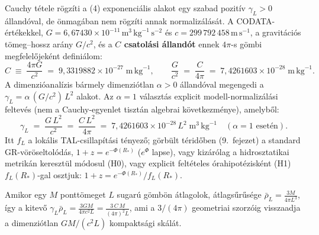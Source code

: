 \documentclass[10pt,a4paper]{article}
\begin{document}
\par
Cauchy t\'etele r\"ogz\'iti a (4) exponenci\'alis alakot egy szabad pozit\'iv $\gamma_L > 0$ \'alland\'oval, de \"onmag\'aban nem r\"ogz\'iti annak normaliz\'al\'as\'at. A CODATA-\'ert\'ekekkel, $G = 6{,}67430\times 10^{-11}\,\text{m}^3\,\text{kg}^{-1}\,\text{s}^{-2}$ \'es $c = 299\,792\,458\,\text{m}\,\text{s}^{-1}$, a gravit\'aci\'os t\"omeg--hossz ar\'any $G/c^2$, \'es a \textbf{$C$ csatol\'asi \'alland\'ot} ennek $4\pi$-s g\"ombi megfelel\H{o}jek\'ent defini\'alom:
\begin{equation}
  C \;\equiv\; \frac{4\pi G}{c^2} \;=\; 9{,}3319882\times 10^{-27}\;\text{m}\,\text{kg}^{-1}, \qquad
  \frac{G}{c^2} \;=\; \frac{C}{4\pi} \;=\; 7{,}4261603\times 10^{-28}\;\text{m}\,\text{kg}^{-1}.
\end{equation}
A dimenzi\'oanal\'izis b\'armely dimenzi\'otlan $\alpha > 0$ \'alland\'oval megengedi a $\gamma_L = \alpha\,(G/c^2)\,L^2$ alakot. Az $\alpha = 1$ v\'alaszt\'as explicit modell-normaliz\'al\'asi feltev\'es (nem a Cauchy-egyenlet tiszt\'an algebrai k\"ovetkezm\'enye), amelyb\H{o}l:
\begin{equation}
  \gamma_L \;=\; \frac{G\,L^2}{c^2} \;=\; \frac{C\,L^2}{4\pi} \;=\; 7{,}4261603\times 10^{-28}\,L^2\;\text{m}^3\,\text{kg}^{-1}\quad(\alpha=1\text{ eset\'en}).
\end{equation}
Itt $f_L$ a lok\'alis TAL-csillap\'it\'asi t\'enyez\H{o}; g\"orb\"ult t\'erid\H{o}ben (9.\ fejezet) a standard GR-v\"or\"oseltol\'od\'as, $1+z = e^{-\Phi(R_*)}$ ($e^{\Phi}$ lapse), vagy kiz\'ar\'olag a hidrosztatikai metrik\'an kereszt\"ul m\'odosul (H0), vagy explicit felt\'eteles \'orahipot\'ezisk\'ent (H1) $f_L(R_*)$-gal osztjuk: $1+z = e^{-\Phi(R_*)}/f_L(R_*)$.

Amikor egy $M$ pontt\"omeget $L$ sugar\'u g\"omb\"on \'atlagolok, \'atlags\H{u}r\H{u}s\'ege $\bar{\rho}_L = \frac{3M}{4\pi L^3}$, \'igy a kitev\H{o} $\gamma_L \bar{\rho}_L = \frac{3GM}{4\pi c^2 L} = \frac{3\,C\,M}{(4\pi)^2 L}$, ami a $3/(4\pi)$ geometriai szorz\'oig visszaadja a dimenzi\'otlan $GM/(c^2 L)$ kompakts\'agi sk\'al\'at.
\end{document}
